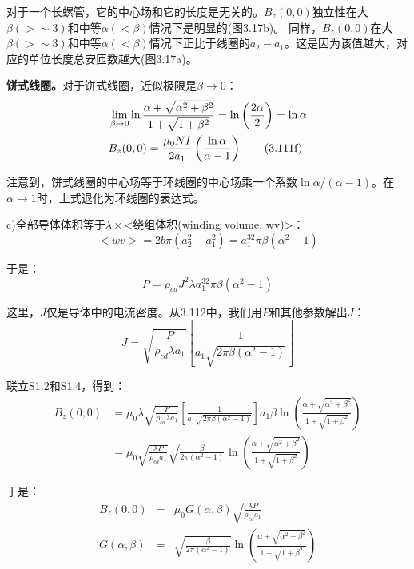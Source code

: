 对于一个长螺管，它的中心场和它的长度是无关的。$B_z(0,0)$独立性在大$\beta(>\sim 3)$和中等$\alpha(<\beta)$情况下是明显的(图3.17b)。
同样，$B_z(0,0)$在大$\beta(>\sim 3)$和中等$\alpha(<\beta)$情况下正比于线圈的$a_2-a_1$。这是因为该值越大，对应的单位长度总安匝数越大(图3.17a)。

\textbf{饼式线圈。}对于饼式线圈，近似极限是$\beta\rightarrow 0$：
\begin{align*}
&\lim_{\beta\rightarrow 0}\ln\frac{\alpha+\sqrt{\alpha^2+\beta^2}}{1+\sqrt{1+\beta^2}}=\ln\left(\frac{2\alpha}{2}\right)=\ln\alpha\notag \\%
&B_z(0,0)=\frac{\mu_0NI}{2a_1}\left(\frac{\ln\alpha}{\alpha-1}\right) \tag{3.111f}%
\end{align*}

注意到，饼式线圈的中心场等于环线圈的中心场乘一个系数$\ln \alpha/(\alpha-1)$。在$\alpha\rightarrow 1$时，上式退化为环线圈的表达式。

c)全部导体体积等于$\lambda\times$<绕组体积(winding volume, wv)>：
\begin{equation*}
<wv>=2b\pi(a_2^2-a_1^2)=a_1^32\pi\beta(\alpha^2-1)%
\end{equation*}

于是：
\begin{equation*}
P=\rho_{cd}J^2\lambda a_1^32\pi\beta(\alpha^2-1) \tag{3.112}%
\end{equation*}

这里，$J$仅是导体中的电流密度。从3.112中，我们用$P$和其他参数解出$J$：
\begin{equation*}
J=\sqrt{\frac{P}{\rho_{cd}\lambda a_1}}\left[\frac{1}{a_1\sqrt{2\pi\beta(\alpha^2-1)}}\right]\tag{S1.4}%
\end{equation*}

联立S1.2和S1.4，得到：
\begin{equation*}
\begin{split}
B_z(0,0)&=\mu_0\lambda\sqrt{\frac{P}{\rho_{cd}\lambda a_1}}\left[\frac{1}{a_1\sqrt{2\pi\beta(\alpha^2-1)}}\right]a_1\beta\ln(\frac{\alpha+\sqrt{\alpha^2+\beta^2}}{1+\sqrt{1+\beta^2}})\\
&=\mu_0\sqrt{\frac{\lambda P}{\rho_{cd}a_1}}\sqrt{\frac{\beta}{2\pi(\alpha^2-1)}}\ln\left(\frac{\alpha+\sqrt{\alpha^2+\beta^2}}{1+\sqrt{1+\beta^2}}\right)%
\end{split}
\end{equation*}

于是：
\begin{subequations}
\begin{align}
B_z(0,0)&=&\mu_0G(\alpha,\beta)\sqrt{\frac{\lambda P}{\rho_{cd}a_1}}\\ %
G(\alpha,\beta)&=&\sqrt{\frac{\beta}{2\pi(\alpha^2-1)}}\ln\left(\frac{\alpha+\sqrt{\alpha^2+\beta^2}}{1+\sqrt{1+\beta^2}}\right)%
\end{align}
\end{subequations}

